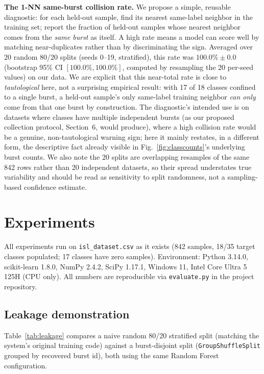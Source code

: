 \documentclass[runningheads]{llncs}
\begin{document}
\textbf{The 1-NN same-burst collision rate.} We propose a simple,
reusable diagnostic: for each held-out sample, find its nearest same-label
neighbor in the training set; report the fraction of held-out samples
whose nearest neighbor comes from the \emph{same burst} as itself. A high
rate means a model can score well by matching near-duplicates rather than
by discriminating the sign. Averaged over 20 random 80/20 splits (seeds
0--19, stratified), this rate was $100.0\% \pm 0.0$ (bootstrap 95\% CI
$[100.0\%, 100.0\%]$, computed by resampling the 20 per-seed values) on
our data. We are explicit that this near-total rate is close to
\emph{tautological} here, not a surprising empirical result: with 17 of 18
classes confined to a single burst, a held-out sample's only same-label
training neighbor \emph{can only} come from that one burst by
construction. The diagnostic's intended use is on datasets where classes
have multiple independent bursts (as our proposed collection protocol,
Section~6, would produce), where a high collision rate would be a
genuine, non-tautological warning sign; here it mainly restates, in a
different form, the descriptive fact already visible in
Fig.~\ref{fig:classcounts}'s underlying burst counts. We also note the 20
splits are overlapping resamples of the same 842 rows rather than 20
independent datasets, so their spread understates true variability and
should be read as sensitivity to split randomness, not a sampling-based
confidence estimate.

\section{Experiments}

All experiments run on \texttt{isl\_dataset.csv} as it exists (842
samples, 18/35 target classes populated; 17 classes have zero samples).
Environment: Python 3.14.0, scikit-learn 1.8.0, NumPy 2.4.2, SciPy
1.17.1, Windows 11, Intel Core Ultra 5 125H (CPU only). All numbers are
reproducible via \texttt{evaluate.py} in the project repository.

\subsection{Leakage demonstration}

Table~\ref{tab:leakage} compares a naive random 80/20 stratified split
(matching the system's original training code) against a burst-disjoint
split (\texttt{GroupShuffleSplit} grouped by recovered burst id), both
using the same Random Forest configuration.
\end{document}
